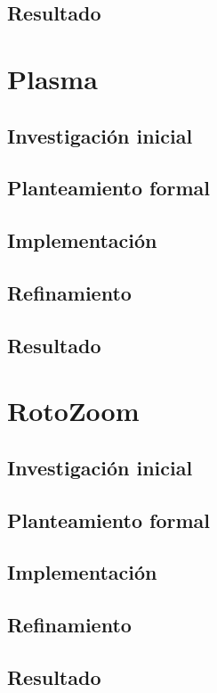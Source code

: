 \subsection{Resultado}

\section{Plasma}

\subsection{Investigación inicial}
\subsection{Planteamiento formal}
\subsection{Implementación}
\subsection{Refinamiento}
\subsection{Resultado}

\section{RotoZoom}

\subsection{Investigación inicial}
\subsection{Planteamiento formal}
\subsection{Implementación}
\subsection{Refinamiento}
\subsection{Resultado}

